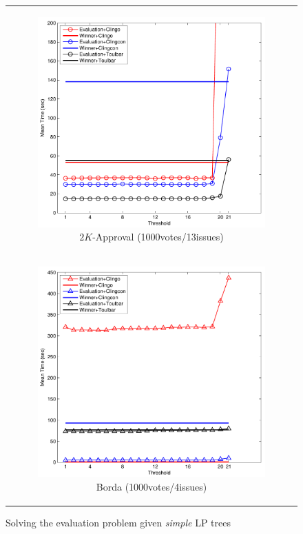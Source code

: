 \begin{figure}[!ht]
\begin{tabular}{c}
\begin{subfigure}[b]{0.5\textwidth}
		\includegraphics[width=\textwidth]{figs/2kAppMSCICP_1000v_13i.pdf}
    \caption{$2K$-Approval (1000votes/13issues)}
		\label{fig:comparison:eval:2}
	\end{subfigure}
  \\
  \begin{subfigure}[b]{0.5\textwidth}
		\includegraphics[width=\textwidth]{figs/bordaMSCICP_1000v_4i.pdf}
    \caption{Borda (1000votes/4issues)}
		\label{fig:comparison:eval:3}
	\end{subfigure}
	\end{tabular}
  \caption{Solving the evaluation problem given \textit{simple} LP trees}
  \label{fig:eval}
\end{figure}

